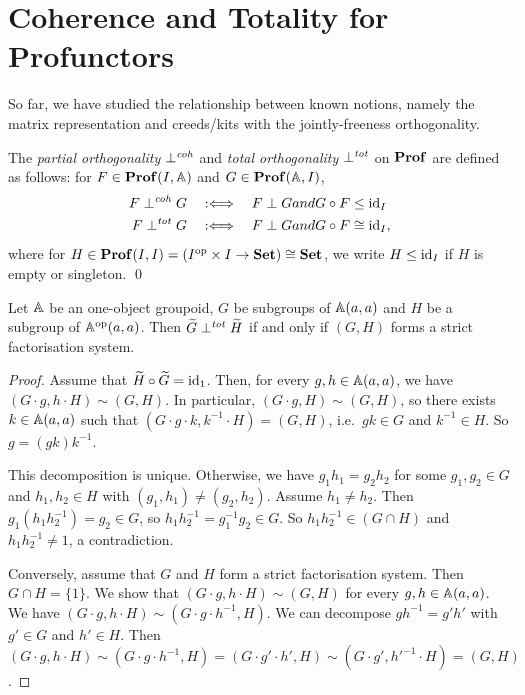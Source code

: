 \section{Coherence and Totality for Profunctors}
So far, we have studied the relationship between known notions, namely the matrix representation and creeds/kits with the jointly-freeness orthogonality.

\begin{definition}
    The \emph{partial orthogonality} \( \mathrel{\bot}^{\mathit{coh}} \) and \emph{total orthogonality} \( \mathrel{\bot}^{\mathit{tot}} \) on \( \mathbf{Prof} \) are defined as follows:
    for \( F \in \mathbf{Prof}(I, \mathbb{A}) \) and \( G \in \mathbf{Prof}(\mathbb{A}, I) \),
    \begin{align*}
        F \mathrel{\bot}^{\mathit{coh}} G &\quad:\Longleftrightarrow\quad F \mathrel{\bot} G \relax{ and } G \circ F \le \mathrm{id}_I \\ 
        F \mathrel{\bot}^{\mathit{tot}} G &\quad:\Longleftrightarrow\quad F \mathrel{\bot} G \relax{ and } G \circ F \cong \mathrm{id}_I,
    \end{align*}
    where for \( H \in \mathbf{Prof}(I,I) = (I^{\mathrm{op}} \times I \to \mathbf{Set}) \cong \mathbf{Set} \), we write \( H \le \mathrm{id}_I \) if \( H \) is empty or singleton.
    \qed
\end{definition}

\begin{proposition}
    Let \( \mathbb{A} \) be an one-object groupoid, \( G \) be subgroups of \( \mathbb{A}(a,a) \) and \( H \) be a subgroup of \( \mathbb{A}^{\mathrm{op}}(a,a) \).
    Then \( \widetilde{G} \mathrel{\bot}^{\mathit{tot}} \widetilde{H} \) if and only if \( (G, H) \) forms a strict factorisation system.
\end{proposition}
\begin{proof}
    Assume that \( \widetilde{H} \circ \widetilde{G} = \mathrm{id}_1 \).
    Then, for every \( g, h \in \mathbb{A}(a,a) \), we have \( (G \cdot g, h \cdot H) \sim (G, H) \).
    In particular, \( (G \cdot g, H) \sim (G, H) \), so there exists \( k \in \mathbb{A}(a,a) \) such that \( (G \cdot g \cdot k, k^{-1} \cdot H) = (G, H) \), i.e.~\( gk \in G \) and \( k^{-1} \in H \).
    So \( g = (gk) k^{-1} \).

    This decomposition is unique.
    Otherwise, we have \( g_1 h_1 = g_2 h_2 \) for some \( g_1, g_2 \in G \) and \( h_1, h_2 \in H \) with \( (g_1, h_1) \neq (g_2, h_2) \).
    Assume \( h_1 \neq h_2 \).
    Then \( g_1 (h_1 h_2^{-1}) = g_2 \in G \), so \( h_1 h_2^{-1} = g_1^{-1} g_2 \in G \).
    So \( h_1 h_2^{-1} \in (G \cap H) \) and \( h_1 h_2^{-1} \neq 1 \), a contradiction.

    Conversely, assume that \( G \) and \( H \) form a strict factorisation system.
    Then \( G \cap H = \{ 1 \} \).
    We show that \( (G \cdot g, h \cdot H) \sim (G, H) \) for every \( g, h \in \mathbb{A}(a,a) \).
    We have \( (G \cdot g, h \cdot H) \sim (G \cdot g \cdot h^{-1}, H) \).
    We can decompose \( g h^{-1} = g' h' \) with \( g' \in G \) and \( h' \in H \).
    Then \( (G \cdot g, h \cdot H) \sim (G \cdot g \cdot h^{-1}, H) = (G \cdot g' \cdot h', H) \sim (G \cdot g', h'^{-1} \cdot H) = (G, H) \).
\end{proof}

